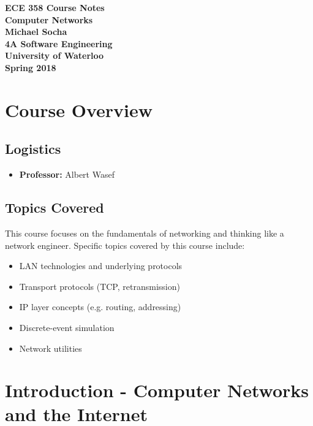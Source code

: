 \documentclass[12pt,titlepage]{article}
\begin{document}
  \begin{titlepage}
    \vspace*{\fill}
    \centering

    \textbf{\Huge ECE 358 Course Notes} \\ [0.4em]
    \textbf{\Large Computer Networks} \\ [1em]
    \textbf{\Large Michael Socha} \\ [1em]
    \textbf{\large 4A Software Engineering} \\
    \textbf{\large University of Waterloo} \\
    \textbf{\large Spring 2018} \\
    \vspace*{\fill}
  \end{titlepage}

  \newpage 

  \tableofcontents

  \newpage

  \section{Course Overview}
    \subsection{Logistics}
      \begin{itemize}
        \item \textbf{Professor:} Albert Wasef
      \end{itemize}

    \subsection{Topics Covered}
      This course focuses on the fundamentals of networking and thinking like a network engineer.
      Specific topics covered by this course include:
      \begin{itemize}
        \item LAN technologies and underlying protocols
        \item Transport protocols (TCP, retransmission)
        \item IP layer concepts (e.g. routing, addressing)
        \item Discrete-event simulation
        \item Network utilities
      \end{itemize}

  \section{Introduction - Computer Networks and the Internet}
\end{document}
